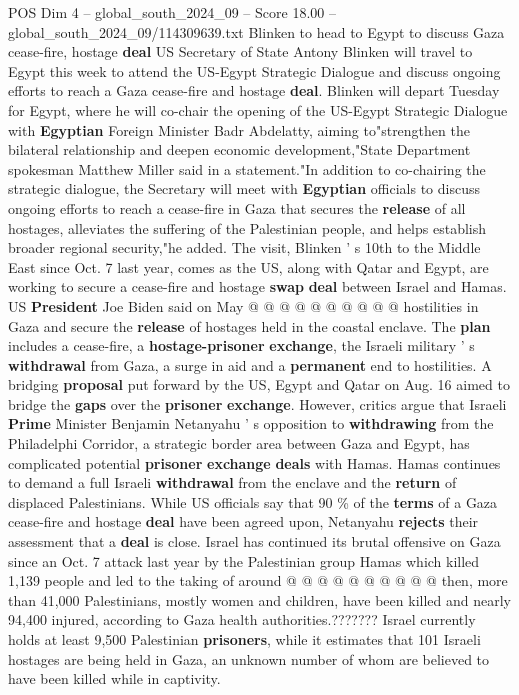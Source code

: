 \begin{textsample}{POS Dim 4 – global\_south\_2024\_09 – Score 18.00 – global\_south\_2024\_09/114309639.txt}  \label{ex:f4_pos_297}
Blinken to head to Egypt to discuss Gaza cease-fire, hostage \textbf{deal} US Secretary of State Antony Blinken will travel to Egypt this week to attend the US-Egypt Strategic Dialogue and discuss ongoing efforts to reach a Gaza cease-fire and hostage \textbf{deal}.
Blinken will depart Tuesday for Egypt, where he will co-chair the opening of the US-Egypt Strategic Dialogue with \textbf{Egyptian} Foreign Minister Badr Abdelatty, aiming to"strengthen the bilateral relationship and deepen economic development,"State Department spokesman Matthew Miller said in a statement."In addition to co-chairing the strategic dialogue, the Secretary will meet with \textbf{Egyptian} officials to discuss ongoing efforts to reach a cease-fire in Gaza that secures the \textbf{release} of all hostages, alleviates the suffering of the Palestinian people, and helps establish broader regional security,"he added.
The visit, Blinken ' s 10th to the Middle East since Oct. 7 last year, comes as the US, along with Qatar and Egypt, are working to secure a cease-fire and hostage \textbf{swap} \textbf{deal} between Israel and Hamas.
US \textbf{President} Joe Biden said on May @ @ @ @ @ @ @ @ @ @ hostilities in Gaza and secure the \textbf{release} of hostages held in the coastal enclave.
The \textbf{plan} includes a cease-fire, a \textbf{hostage-prisoner} \textbf{exchange}, the Israeli military ' s \textbf{withdrawal} from Gaza, a surge in aid and a \textbf{permanent} end to hostilities.
A bridging \textbf{proposal} put forward by the US, Egypt and Qatar on Aug. 16 aimed to bridge the \textbf{gaps} over the \textbf{prisoner} \textbf{exchange}.
However, critics argue that Israeli \textbf{Prime} Minister Benjamin Netanyahu ' s opposition to \textbf{withdrawing} from the Philadelphi Corridor, a strategic border area between Gaza and Egypt, has complicated potential \textbf{prisoner} \textbf{exchange} \textbf{deals} with Hamas.
Hamas continues to demand a full Israeli \textbf{withdrawal} from the enclave and the \textbf{return} of displaced Palestinians.
While US officials say that 90 \% of the \textbf{terms} of a Gaza cease-fire and hostage \textbf{deal} have been agreed upon, Netanyahu \textbf{rejects} their assessment that a \textbf{deal} is close.
Israel has continued its brutal offensive on Gaza since an Oct. 7 attack last year by the Palestinian group Hamas which killed 1,139 people and led to the taking of around @ @ @ @ @ @ @ @ @ @ then, more than 41,000 Palestinians, mostly women and children, have been killed and nearly 94,400 injured, according to Gaza health authorities.???????
Israel currently holds at least 9,500 Palestinian \textbf{prisoners}, while it estimates that 101 Israeli hostages are being held in Gaza, an unknown number of whom are believed to have been killed while in captivity.

\end{textsample}
